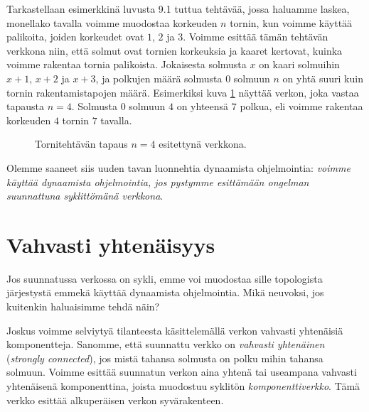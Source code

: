 Tarkastellaan esimerkkinä luvusta 9.1 tuttua tehtävää,
jossa haluamme laskea, monellako tavalla voimme muodostaa
korkeuden $n$ tornin, kun voimme käyttää palikoita,
joiden korkeudet ovat $1$, $2$ ja $3$.
Voimme esittää tämän tehtävän verkkona niin,
että solmut ovat tornien korkeuksia ja kaaret kertovat,
kuinka voimme rakentaa tornia palikoista.
Jokaisesta solmusta $x$ on kaari solmuihin
$x+1$, $x+2$ ja $x+3$,
ja polkujen määrä solmusta $0$ solmuun $n$
on yhtä suuri kuin tornin rakentamistapojen määrä.
Esimerkiksi kuva \ref{fig:verkol} näyttää verkon,
joka vastaa tapausta $n=4$.
Solmusta $0$ solmuun $4$ on yhteensä $7$ polkua,
eli voimme rakentaa korkeuden $4$ tornin $7$ tavalla.

\begin{figure}
\center
\begin{center}
\end{center}
\caption{Tornitehtävän tapaus $n=4$ esitettynä verkkona.}
\label{fig:verkol}
\end{figure}

Olemme saaneet siis uuden tavan luonnehtia dynaamista ohjelmointia:
\emph{voimme käyttää dynaamista ohjelmointia,
jos pystymme esittämään ongelman suunnattuna syklittömänä verkkona}.

\section{Vahvasti yhtenäisyys}


Jos suunnatussa verkossa on sykli,
emme voi muodostaa sille topologista järjestystä
emmekä käyttää dynaamista ohjelmointia.
Mikä neuvoksi, jos kuitenkin haluaisimme tehdä näin?

Joskus voimme selviytyä tilanteesta käsittelemällä
verkon vahvasti yhtenäisiä komponentteja.
Sanomme, että suunnattu verkko on \emph{vahvasti yhtenäinen}
(\emph{strongly connected}),
jos mistä tahansa solmusta on polku mihin tahansa solmuun.
Voimme esittää suunnatun verkon aina yhtenä tai
useampana vahvasti yhtenäisenä komponenttina,
joista muodostuu syklitön \emph{komponenttiverkko}.
Tämä verkko esittää alkuperäisen verkon syvärakenteen.

